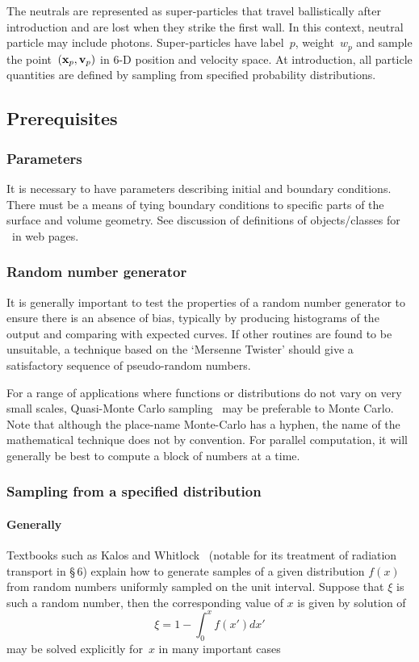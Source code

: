 The neutrals are represented as super-particles that travel ballistically after introduction
and are lost when they strike the first wall.  In this context, neutral
particle may include photons.
Super-particles have label~$p$, weight~$w_p$ and sample the
point~$({\bf x}_p, {\bf v}_p)$ in 6-D position and velocity space.
At introduction, all particle quantities are defined by sampling
from specified probability distributions.

\subsection{Prerequisites}\label{sec:31prereq}
\subsubsection{Parameters}\label{sec:31param}
It is necessary to have parameters describing initial and boundary conditions.
There must be a means of tying boundary conditions to specific parts
of the surface and volume geometry. See discussion of definitions
of objects/classes for \nep \ in web pages.

\subsubsection{Random number generator}\label{sec:RNG}
It is generally important to test the properties of a random number generator
to ensure there is an absence of bias, typically by producing histograms of
the output and comparing with expected curves. If other routines are found to be unsuitable,
a technique based on the `Mersenne Twister' should give a satisfactory sequence
of pseudo-random numbers. 

For a range of applications where
functions or distributions do not vary on very small scales, Quasi-Monte Carlo
sampling~\cite{niederreiter} may be preferable to Monte Carlo. Note that although the place-name
Monte-Carlo has a hyphen, the name of the mathematical technique does not by convention.
For parallel computation, it will generally be best to compute a block of numbers at a time.

\subsubsection{Sampling from a specified distribution}\label{sec:specdist}
\paragraph{Generally}\label{specdistgen}
Textbooks such as Kalos and Whitlock~\cite{kaloswhitlock} (notable
for its treatment of radiation transport in \S\,6)  explain how to
generate samples of a given distribution $f(x)$ 
from random numbers uniformly sampled on the unit interval. Suppose that
$\xi$ is such a random number, then the corresponding value of $x$ is given by
solution of
\begin{equation}\label{eq:invdistbn}
\xi=1-\int_0^x f(x')dx'
\end{equation}
 may be solved explicitly for~$x$ in many important cases

